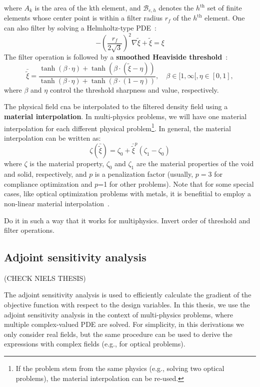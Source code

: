 where $A_k$ is the area of the kth element, and $\mathcal{B}_{e, h}$ denotes the
$h^\text{th}$ set of finite elements whose center point is within a filter radius $r_f$ of the
$h^\text{th}$ element. One can also filter by solving a Helmholtz-type PDE~\cite{PDE_filter}:
\begin{equation}
    -\left(\frac{r_f}{2 \sqrt{3}}\right)^2 \nabla \tilde{\xi}+\tilde{\xi}=\xi
\end{equation}
The filter operation is followed by a \textbf{smoothed Heaviside threshold}~\cite{projection}:
\begin{equation}
    \bar{\tilde{\xi}}=\frac{\tanh (\beta \cdot \eta)+\tanh (\beta \cdot(\tilde{\xi}-\eta))}{\tanh (\beta \cdot \eta)+\tanh (\beta \cdot(1-\eta))}, \quad \beta \in[1, \infty[, \eta \in[0,1],
\end{equation}
where $\beta$ and $\eta$ control the threshold sharpness and value, respectively.

The physical field cna be interpolated to the filtered density field using a \textbf{material interpolation}.
In multi-physics problems, we will have one material interpolation for each different physical problem\footnote{If the problem stem from the same physics (e.g., solving two optical problems), the material interpolation can be re-used.}.
In general, the material interpolation can be written as:
\begin{equation}
    \zeta(\bar{\tilde{\xi}})=\zeta_0+\bar{\tilde{\xi}}^p\left(\zeta_1-\zeta_0\right)
\end{equation}
where $\zeta$ is the material property, $\zeta_0$ and $\zeta_1$ are the material properties of the void and solid, respectively, and $p$
is a penalization factor (usually, $p=3$ for compliance optimization and $p$=1 for other problems). Note that for some
special cases, like optical optimization problems with metals, it is benefitial to employ a non-linear material interpolation~\cite{nonlinear_interp}.

Do it in such a way that it works for multiphysics.
Invert order of threshold and filter operations.

\subsection{Adjoint sensitivity analysis}

(CHECK NIELS THESIS)

The adjoint sensitivity analysis is used to efficiently calculate the gradient of the objective function with 
respect to the design variables. In this thesis, we use the adjoint sensitivity analysis  in the context of 
multi-physics problems, where multiple complex-valued PDE are solved. For simplicity, in this derivations we only consider
real fields, but the same procedure can be used to derive the expressions with complex fields (e.g., for optical problems).

